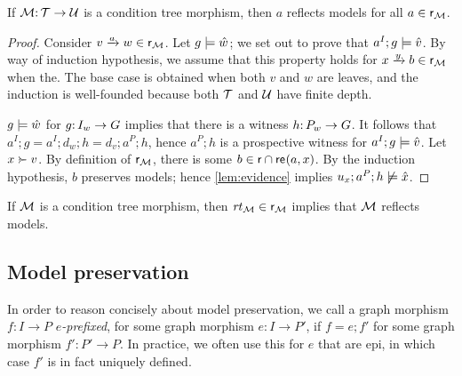 \begin{lemma}\label{lem:reflection}
If ${\mathcal{M}}{:}\, {\mathcal{T}}\rightarrow {\mathcal{U}}$ is a condition tree morphism, then $a$ reflects models for all $a\in{\mathsf{r}}_{\mathcal{M}}$.
\end{lemma}
%
\begin{proof}
Consider $\trip vaw\in \rgen_\cM$. Let $g\models \hat w$; we set out to prove that $a^I;g\models \hat v$. By way of induction hypothesis, we assume that this property holds for $\trip xyb\in \rgen_\cM$ when the. The base case is obtained when both $v$ and $w$ are leaves, and the induction is well-founded because both ${\mathcal{T}}$ and ${\mathcal{U}}$ have finite depth.

$g\models \hat w$ for $g{:}\, I_w\rightarrow G$ implies that there is a witness $h{:}\, P_w\rightarrow G$. It follows that $a^I;g=a^I;d_w;h=d_v;a^P;h$, hence $a^P;h$ is a prospective witness for $a^I;g\models \hat v$. Let $x\childof v$. By definition of ${\mathsf{r}}_{\mathcal{M}}$, there is some $b\in {\mathsf{r}} \cap \mathsf{re}_{}(a,x)$. By the induction hypothesis, $b$ preserves models; hence \ref{lem:evidence} implies $u_x;a^P;h\not\models \hat x$.
\end{proof}

\begin{corollary}
If ${\mathcal{M}}$ is a condition tree morphism, then $\mathit{rt}_{{\mathcal{M}}}\in {\mathsf{r}}_{\mathcal{M}}$ implies that ${\mathcal{M}}$ reflects models.
\end{corollary}

\subsection{Model preservation}

In order to reason concisely about model preservation, we call a graph morphism $f:I\to P$ \emph{$e$-prefixed}, for some graph morphism $e:I\to P'$, if $f=e;f'$ for some graph morphism $f':P'\to P$. In practice, we often use this for $e$ that are epi, in which case $f'$ is in fact uniquely defined.

